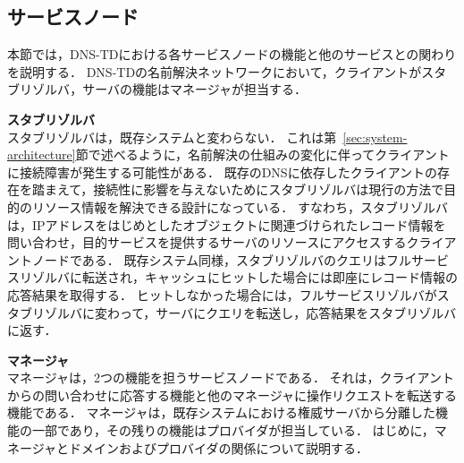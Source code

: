 \subsection{サービスノード}
本節では，DNS-TDにおける各サービスノードの機能と他のサービスとの関わりを説明する．
DNS-TDの名前解決ネットワークにおいて，クライアントがスタブリゾルバ，サーバの機能はマネージャが担当する．\newline

\hspace{-12pt}\textbf{スタブリゾルバ}\\
\label{sec:stab-resolver}
\hspace{12pt}スタブリゾルバは，既存システムと変わらない．
これは第~\ref{sec:system-architecture}節で述べるように，名前解決の仕組みの変化に伴ってクライアントに接続障害が発生する可能性がある．
既存のDNSに依存したクライアントの存在を踏まえて，接続性に影響を与えないためにスタブリゾルバは現行の方法で目的のリソース情報を解決できる設計になっている．
すなわち，スタブリゾルバは，IPアドレスをはじめとしたオブジェクトに関連づけられたレコード情報を問い合わせ，目的サービスを提供するサーバのリソースにアクセスするクライアントノードである．
既存システム同様，スタブリゾルバのクエリはフルサービスリゾルバに転送され，キャッシュにヒットした場合には即座にレコード情報の応答結果を取得する．
ヒットしなかった場合には，フルサービスリゾルバがスタブリゾルバに変わって，サーバにクエリを転送し，応答結果をスタブリゾルバに返す．\newline

\hspace{-12pt}\textbf{マネージャ}\\
\hspace{12pt} マネージャは，2つの機能を担うサービスノードである．
それは，クライアントからの問い合わせに応答する機能と他のマネージャに操作リクエストを転送する機能である．
マネージャは，既存システムにおける権威サーバから分離した機能の一部であり，その残りの機能はプロバイダが担当している．
はじめに，マネージャとドメインおよびプロバイダの関係について説明する．

